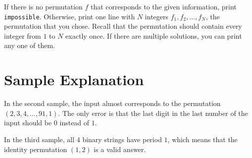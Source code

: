 \begin{Output}
    If there is no permutation $f$ that corresponds to the given information, print \verb|impossible|.
    Otherwise, print one line with $N$ integers $f_1, f_2,  \dots, f_N$, the permutation that you chose. Recall that the permutation 
    should contain every integer from $1$ to $N$ exactly once. If there are multiple solutions, you can print any one of them.
\end{Output}

\section*{Sample Explanation}

In the second sample, the input almost corresponds to the permutation $(2,3,4,\dots, 91, 1)$. The only error is that the last digit in the last number 
of the input should be $0$ instead of $1$.

In the third sample, all $4$ binary strings have period $1$, which means that the identity permutation $(1,2)$ is a valid answer.
